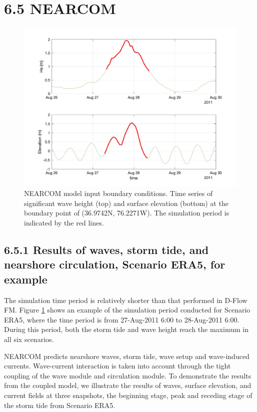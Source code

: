 \documentclass[11pt]{article}
\begin{document}
\section*{6.5 NEARCOM} 

\begin{figure}[h!]
\centering
\includegraphics[width=\textwidth]{./figures/nearcom_wave_flow.jpg}
\caption{NEARCOM model input boundary conditions. Time series of significant wave height (top) and surface elevation (bottom) at the boundary point of (36.9742N, 76.2271W). The simulation period is indicated by the red lines. }
\label{ERA5_time}
\centering
\end{figure}

\subsection*{6.5.1 Results of waves, storm tide, and nearshore circulation, Scenario ERA5, for example}

The simulation time period is relatively shorter than that performed in D-Flow FM.  Figure \ref{ERA5_time} shows an example of the simulation period conducted for Scenario ERA5, where the time period is from 27-Aug-2011 6:00 to 28-Aug-2011 6:00. During this period, both the storm tide and wave height reach the maximum in all six scenarios.   

NEARCOM predicts nearshore waves, storm tide, wave setup and wave-induced currents. Wave-current interaction is taken into account through the tight coupling of the wave module and circulation module.  To demonstrate the results from the coupled model, we illustrate the results of waves, surface elevation, and current fields at three snapshots, the beginning stage, peak and receding stage of the storm tide from Scenario ERA5. 
\end{document}
